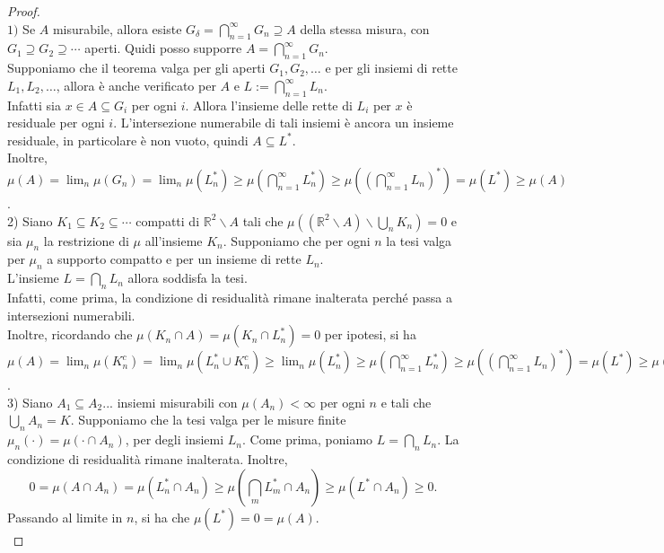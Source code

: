 \documentclass[a4paper, twoside,openright]{article}
\newcommand{\<}{\langle}
\renewcommand{\>}{\rangle}
\begin{document}
\begin{proof} \hfill \\
	$1)$ Se $A$ misurabile, allora esiste $G_{\delta} = \bigcap_{n=1}^{\infty} G_{n} \supseteq A$ della stessa misura, con $G_{1} \supseteq G_{2} \supseteq \cdots$ aperti. Quidi posso supporre $A=\bigcap_{n=1}^{\infty} G_{n}$.\\
	Supponiamo che il teorema valga per gli aperti $G_{1}, G_{2}, \ldots$ e per gli insiemi di rette $L_{1}, L_{2}, \ldots$, allora è anche verificato per  $A$ e $L:=\bigcap_{n=1}^{\infty} L_{n}$.\\
	Infatti sia $x \in A \subseteq G_i$ per ogni $i$. Allora l'insieme delle rette di $L_i$ per $x$ è residuale per ogni $i$. L'intersezione numerabile di tali insiemi è ancora un insieme residuale, in particolare è non vuoto, quindi $A \subseteq L^*$.\\
	Inoltre, $\mu(A) = \lim_n \mu(G_n) = \lim_n \mu(L_n^*) \geq \mu\left(\bigcap_{n=1}^\infty L_n^*\right) \geq \mu\left(\left(\bigcap_{n=1}^\infty L_n\right)^*\right) = \mu(L^*) \geq \mu(A)$. \\

	2) Siano $K_{1} \subseteq K_{2} \subseteq \cdots$ compatti di $\mathbb{R}^{2} \backslash A$ tali che $\mu\left(\left(\mathbb{R}^{2} \backslash A\right) \backslash \bigcup_{n} K_{n}\right)=0$ e sia $\mu_{n}$ la restrizione di $\mu$ all'insieme $K_{n}$. Supponiamo che per ogni $n$ la tesi valga per $\mu_n$ a supporto compatto e per un insieme di rette $L_n$.\\
	L'insieme $L=\bigcap_n L_n$ allora soddisfa la tesi.\\
	Infatti, come prima, la condizione di residualità rimane inalterata perché passa a intersezioni numerabili.\\
	Inoltre, ricordando che $\mu(K_n \cap A)=\mu(K_n \cap L_n^*)=0$ per ipotesi, si ha 
	$\mu(A)=\lim_n\mu(K_n^c)=\lim_n\mu(L_n^* \cup K_n^c) \geq \lim_n \mu(L_n^*) \geq \mu\left(\bigcap_{n=1}^\infty L_n^*\right) \geq \mu\left(\left(\bigcap_{n=1}^\infty L_n\right)^*\right) = \mu(L^*) \geq \mu(A)$.\\

	3) Siano $A_1 \subseteq A_2 ...$ insiemi misurabili con $\mu(A_n) < \infty$ per ogni $n$ e tali che $\bigcup_n A_n=K$. Supponiamo che la tesi valga per le misure finite $\mu_n(\cdot)=\mu( \cdot \cap A_n)$, per degli insiemi $L_n$. Come prima, poniamo $L=\bigcap_n L_n$. La condizione di residualità rimane inalterata. Inoltre,
	$$0= \mu(A \cap A_n)=\mu(L_n^* \cap A_n)\geq\mu(\textstyle\bigcap_mL_m^* \cap A_n) \geq \mu(L^* \cap A_n) \geq 0.$$
	Passando al limite in $n$, si ha che $\mu(L^*)=0=\mu(A)$.\\


\end{proof}
\end{document}
